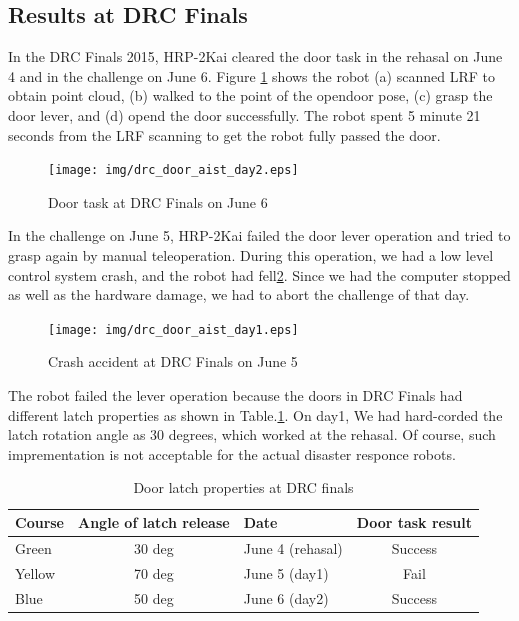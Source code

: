 \subsection{Results at DRC Finals}
%
In the DRC Finals 2015, HRP-2Kai cleared the door task in the rehasal on June 4 and in
the challenge on June 6. Figure \ref{fig:drc_door_aist_day2} shows the robot (a) scanned LRF 
to obtain point cloud, (b) walked to the point of the opendoor pose, (c) grasp the door lever, and (d)
 opend the door successfully. The robot spent 5 minute 21 seconds from the LRF scanning to get the 
robot fully passed the door.
%
\begin{figure}[t]
  \centering
  \texttt{[image: img/drc\_door\_aist\_day2.eps]}
  \caption{Door task at DRC Finals on June 6}
  \label{fig:drc_door_aist_day2}
\end{figure}

In the challenge on June 5, HRP-2Kai failed the door lever operation and tried to
grasp again by manual teleoperation. During this operation, we had a low level control system crash, 
and the robot had fell\ref{fig:drc_door_aist_day1}.
Since we had the computer stopped as well as the hardware damage, we had to abort the challenge of that day. 
%
\begin{figure}[t]
  \centering
  \texttt{[image: img/drc\_door\_aist\_day1.eps]}
  \caption{Crash accident at DRC Finals on June 5}
  \label{fig:drc_door_aist_day1}
\end{figure}

The robot failed the lever operation because the doors in DRC Finals had different latch properties
as shown in Table.\ref{tbl:door_latch}. On day1, We had hard-corded the latch rotation angle as 30 degrees,
which worked at the rehasal. Of course, such imprementation is not acceptable 
for the actual disaster responce robots.
%
\begin{table}[htb]
\caption{Door latch properties at DRC finals} \label{tbl:door_latch}
\begin{tabular}{lclc}
\hline
Course & Angle of latch release & Date & Door task result  \\ 
\hline
Green & 30 deg & June 4 (rehasal) & Success  \\
Yellow & 70 deg & June 5 (day1) & Fail \\
Blue &  50 deg & June 6 (day2)  & Success \\
\hline
\end{tabular}
\end{table}

